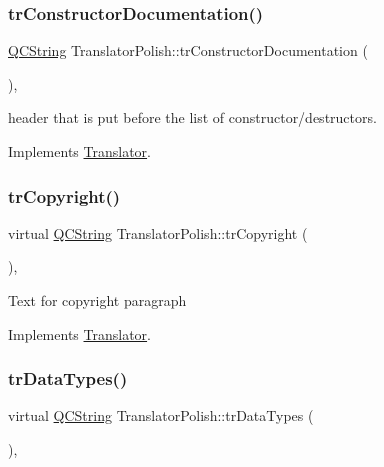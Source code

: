 \subsubsection{\texorpdfstring{trConstructorDocumentation()}{trConstructorDocumentation()}}
{\footnotesize\ttfamily \mbox{\hyperlink{class_q_c_string}{Q\+C\+String}} Translator\+Polish\+::tr\+Constructor\+Documentation (\begin{DoxyParamCaption}{ }\end{DoxyParamCaption})\hspace{0.3cm}{\ttfamily [inline]}, {\ttfamily [virtual]}}

header that is put before the list of constructor/destructors. 

Implements \mbox{\hyperlink{class_translator}{Translator}}.

\mbox{\label{class_translator_polish_a153f56dc96f1f3fa3caccf30a556ba04}} 
\subsubsection{\texorpdfstring{trCopyright()}{trCopyright()}}
{\footnotesize\ttfamily virtual \mbox{\hyperlink{class_q_c_string}{Q\+C\+String}} Translator\+Polish\+::tr\+Copyright (\begin{DoxyParamCaption}{ }\end{DoxyParamCaption})\hspace{0.3cm}{\ttfamily [inline]}, {\ttfamily [virtual]}}

Text for copyright paragraph 

Implements \mbox{\hyperlink{class_translator}{Translator}}.

\mbox{\label{class_translator_polish_acb28b0dd728c14571732cad0353ad699}} 
\subsubsection{\texorpdfstring{trDataTypes()}{trDataTypes()}}
{\footnotesize\ttfamily virtual \mbox{\hyperlink{class_q_c_string}{Q\+C\+String}} Translator\+Polish\+::tr\+Data\+Types (\begin{DoxyParamCaption}{ }\end{DoxyParamCaption})\hspace{0.3cm}{\ttfamily [inline]}, {\ttfamily [virtual]}}

